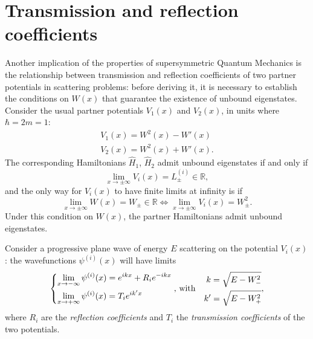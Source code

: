 \section{Transmission and reflection coefficients}
Another implication of the properties of supersymmetric Quantum Mechanics is the relationship
between transmission and reflection coefficients of two partner potentials in scattering
problems: before deriving it, it is necessary to establish the conditions on $W(x)$ that
guarantee the existence of unbound eigenstates.\\

 Consider the usual partner potentials $V_1(x)$ and $V_2(x)$, in units where
$\hbar =2m=1$:
\begin{gather*}
V_1(x)=W^2(x)-W'(x)\\
V_2(x)=W^2(x)+W'(x).
\end{gather*}
The corresponding Hamiltonians $\hat H_1$, $\hat H_2$ admit unbound eigenstates if and only if
$$\lim\limits_{x\to\pm\infty}V_i(x) = L^{(i)}_\pm\in\mathbb{R},$$
and the only way for $V_i(x)$ to have finite limits at infinity is if
$$\lim\limits_{x\to\pm\infty}W(x) = W_\pm\in\mathbb{R}
\iff\lim\limits_{x\to\pm\infty}V_i(x)=W^2_\pm.$$
Under this condition on $W(x)$, the partner Hamiltonians admit unbound eigenstates.

Consider a progressive plane wave of energy $E$ scattering on the potential $V_i(x)$: the
wavefunctions $\psi^{(i)}(x)$ will have limits
$$\begin{dcases*}
      \lim\limits_{x\to-\infty} \psi^{(i)}(x) = e^{ikx}+R_ie^{-ikx}\\
      \lim\limits_{x\to+\infty} \psi^{(i)}(x) = T_ie^{ik'x}
  \end{dcases*}\text{, with}\quad
\begin{aligned}
    k = \sqrt{E-W^2_{-}}\\
    k'= \sqrt{E-W^2_{+}}
\end{aligned},$$
where $R_i$ are the \textit{reflection coefficients} and $T_i$ the \textit{transmission
coefficients} of the two potentials.

